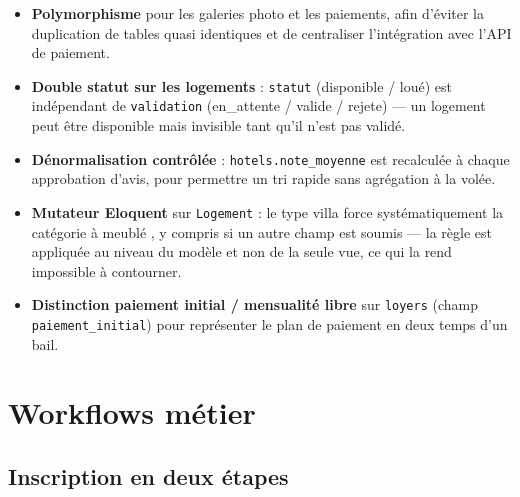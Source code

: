 \documentclass[11pt,a4paper]{report}
\newcommand{\tech}[1]{\texttt{\small #1}}
\begin{document}
\begin{itemize}[leftmargin=1.2cm]
    \item \textbf{Polymorphisme} pour les galeries photo et les paiements, afin d'éviter la duplication de tables quasi identiques et de centraliser l'intégration avec l'API de paiement.
    \item \textbf{Double statut sur les logements} : \tech{statut} (disponible / loué) est indépendant de \tech{validation} (en\_attente / valide / rejete) --- un logement peut être disponible mais invisible tant qu'il n'est pas validé.
    \item \textbf{Dénormalisation contrôlée} : \tech{hotels.note\_moyenne} est recalculée à chaque approbation d'avis, pour permettre un tri rapide sans agrégation à la volée.
    \item \textbf{Mutateur Eloquent} sur \tech{Logement} : le type \og villa \fg{} force systématiquement la catégorie à \og meublé \fg, y compris si un autre champ est soumis --- la règle est appliquée au niveau du modèle et non de la seule vue, ce qui la rend impossible à contourner.
    \item \textbf{Distinction paiement initial / mensualité libre} sur \tech{loyers} (champ \tech{paiement\_initial}) pour représenter le plan de paiement en deux temps d'un bail.
\end{itemize}

\chapter{Workflows métier}

\section{Inscription en deux étapes}

\begin{center}
\end{center}
\end{document}
